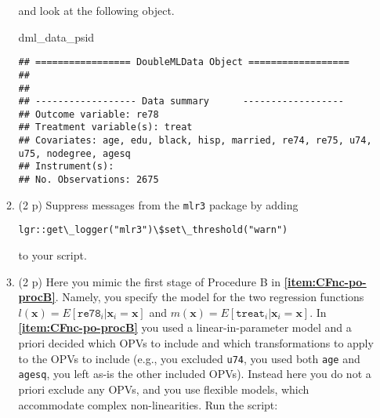 \documentclass[
]{article}
\newenvironment{Shaded}{\begin{snugshade}}{\end{snugshade}}
\newcommand{\AttributeTok}[1]{\textcolor[rgb]{0.13,0.29,0.53}{#1}}
\newcommand{\FunctionTok}[1]{\textcolor[rgb]{0.13,0.29,0.53}{\textbf{#1}}}
\newcommand{\NormalTok}[1]{#1}
\newcommand{\OtherTok}[1]{\textcolor[rgb]{0.56,0.35,0.01}{#1}}
\newcommand{\SpecialCharTok}[1]{\textcolor[rgb]{0.81,0.36,0.00}{\textbf{#1}}}
\newcommand{\StringTok}[1]{\textcolor[rgb]{0.31,0.60,0.02}{#1}}
\begin{document}
\begin{enumerate}
\begin{enumerate}
    and look at the following object.

\begin{Shaded}
\end{Shaded}

\begin{Shaded}
\begin{Highlighting}[]
\NormalTok{dml\_data\_psid}
\end{Highlighting}
\end{Shaded}

\begin{verbatim}
## ================= DoubleMLData Object ==================
## 
## 
## ------------------ Data summary      ------------------
## Outcome variable: re78
## Treatment variable(s): treat
## Covariates: age, edu, black, hisp, married, re74, re75, u74, u75, nodegree, agesq
## Instrument(s): 
## No. Observations: 2675
\end{verbatim}
  \item
    (2 p) Suppress messages from the \texttt{mlr3} package by adding

    \texttt{lgr::get\textbackslash{}\_logger("mlr3")\textbackslash{}\$set\textbackslash{}\_threshold("warn")}

    to your script.

\begin{Shaded}
\end{Shaded}
  \item
    (2 p) Here you mimic the first stage of Procedure B in
    \textbf{\ref{item:CFnc-po-procB}}. Namely, you specify the model for
    the two regression functions
    \(l(\mathbf{x})=E[\texttt{re78}_i|\mathbf{x}_{i}=\mathbf{x}]\) and
    \(m(\mathbf{x})=E[\texttt{treat}_i|\mathbf{x}_{i}=\mathbf{x}]\). In
    \textbf{\ref{item:CFnc-po-procB}} you used a linear-in-parameter
    model and a priori decided which OPVs to include and which
    transformations to apply to the OPVs to include (e.g., you excluded
    \texttt{u74}, you used both \texttt{age} and \texttt{agesq}, you
    left as-is the other included OPVs). Instead here you do not a
    priori exclude any OPVs, and you use flexible models, which
    accommodate complex non-linearities. Run the
    script:\label{item:dml-first-stage-models}


\end{enumerate}
\end{enumerate}
\end{document}
